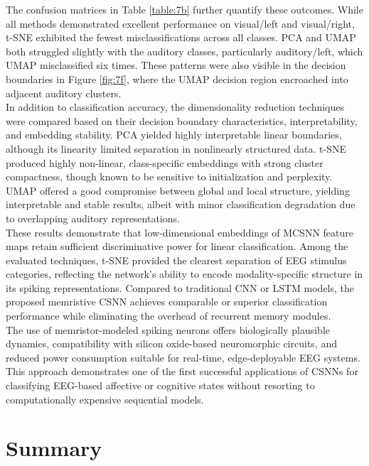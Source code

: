 \noindent The confusion matrices in Table \ref{table:7b} further quantify these outcomes. While all methods demonstrated excellent performance on visual/left and visual/right, t-SNE exhibited the fewest misclassifications across all classes. PCA and UMAP both struggled slightly with the auditory classes, particularly auditory/left, which UMAP misclassified six times. These patterns were also visible in the decision boundaries in Figure \ref{fig:7f}, where the UMAP decision region encroached into adjacent auditory clusters.\\

\noindent In addition to classification accuracy, the dimensionality reduction techniques were compared based on their decision boundary characteristics, interpretability, and embedding stability. PCA yielded highly interpretable linear boundaries, although its linearity limited separation in nonlinearly structured data. t-SNE produced highly non-linear, class-specific embeddings with strong cluster compactness, though known to be sensitive to initialization and perplexity. UMAP offered a good compromise between global and local structure, yielding interpretable and stable results, albeit with minor classification degradation due to overlapping auditory representations.\\

\noindent These results demonstrate that low-dimensional embeddings of MCSNN feature maps retain sufficient discriminative power for linear classification. Among the evaluated techniques, t-SNE provided the clearest separation of EEG stimulus categories, reflecting the network's ability to encode modality-specific structure in its spiking representations. Compared to traditional CNN or LSTM models, the proposed memristive CSNN achieves comparable or superior classification performance while eliminating the overhead of recurrent memory modules. \\

\noindent The use of memristor-modeled spiking neurons offers biologically plausible dynamics, compatibility with silicon oxide-based neuromorphic circuits, and reduced power consumption suitable for real-time, edge-deployable EEG systems. This approach demonstrates one of the first successful applications of CSNNs for classifying EEG-based affective or cognitive states without resorting to computationally expensive sequential models.

\section[Summary]{Summary}

